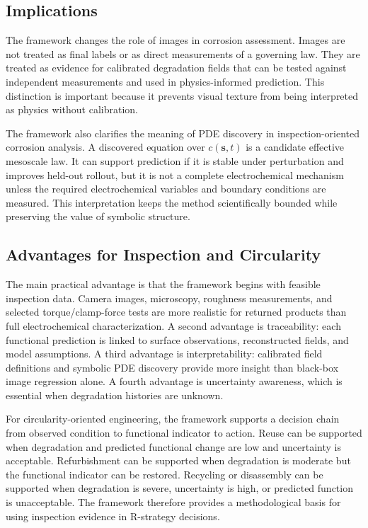 \documentclass[colorlinks,upint,subscriptcorrection,varvw,hyphenate,balance]{asmeconf}
\newcommand{\vect}[1]{\bm{#1}}
\begin{document}
\subsection{Implications}
The framework changes the role of images in corrosion assessment. Images are not treated as final labels or as direct measurements of a governing law. They are treated as evidence for calibrated degradation fields that can be tested
against independent measurements and used in physics-informed prediction. This
distinction is important because it prevents visual texture from being
interpreted as physics without calibration.

The framework also clarifies the meaning of PDE discovery in
inspection-oriented corrosion analysis. A discovered equation over
$c(\vect{s},t)$ is a candidate effective mesoscale law. It can support
prediction if it is stable under perturbation and improves held-out rollout,
but it is not a complete electrochemical mechanism unless the required
electrochemical variables and boundary conditions are measured. This
interpretation keeps the method scientifically bounded while preserving the
value of symbolic structure.

\subsection{Advantages for Inspection and Circularity}
The main practical advantage is that the framework begins with feasible
inspection data. Camera images, microscopy, roughness measurements, and
selected torque/clamp-force tests are more realistic for returned products than
full electrochemical characterization. A second advantage is traceability:
each functional prediction is linked to surface observations, reconstructed
fields, and model assumptions. A third advantage is interpretability:
calibrated field definitions and symbolic PDE discovery provide more insight
than black-box image regression alone. A fourth advantage is uncertainty
awareness, which is essential when degradation histories are unknown.

For circularity-oriented engineering, the framework supports a decision chain
from observed condition to functional indicator to action. Reuse can be
supported when degradation and predicted functional change are low and
uncertainty is acceptable. Refurbishment can be supported when degradation is
moderate but the functional indicator can be restored. Recycling or
disassembly can be supported when degradation is severe, uncertainty is high,
or predicted function is unacceptable. The framework therefore provides a
methodological basis for using inspection evidence in R-strategy decisions.
\end{document}
